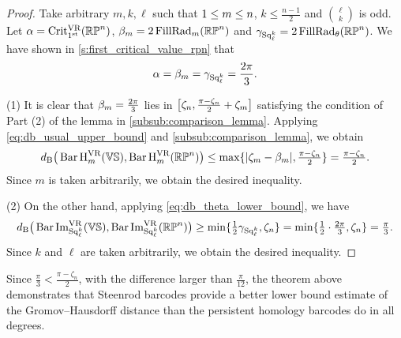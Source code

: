 \begin{proof}
	Take arbitrary $m, k, \ell$ such that $1 \leq m \leq n$, $k \leq \frac{n-1}{2}$ and $\binom{\ell}{k}$ is odd.
    Let $\alpha = \operatorname{Crit^{\mathrm{VR}}_{1^{\mathrm{st}}}}(\mathbb{RP}^n)$, $\beta_m = 2\operatorname{FillRad}_{m}(\mathbb{RP}^n)$ and $\gamma_{\operatorname{Sq}_\ell^k}= 2\operatorname{FillRad}_{\theta}(\mathbb{RP}^n)$.
    We have shown in \cref{s:first_critical_value_rpn} that
	$$
	\alpha = \beta_m = \gamma_{\operatorname{Sq}_\ell^k} = \frac{2\pi}{3}.
	$$

    (1) It is clear that %
    $\beta_m = \tfrac{2\pi}{3}$ lies in $\big[\zeta_n, \tfrac{\pi - \zeta_n}{2}+\zeta_m\big]$ satisfying the condition of Part (2) of the lemma in \cref{subsub:comparison_lemma}.
	Applying \cref{eq:db_usual_upper_bound} and \cref{subsub:comparison_lemma}, we obtain
	\[d_{\mathrm{B}}\big(\operatorname{Bar} \operatorname{H}_{m}^{\mathrm{VR}} (\mathbb{V}\mathbb{S}), \operatorname{Bar} \operatorname{H}_{m}^{\mathrm{VR}} (\mathbb{RP}^n)\big)
    \leq \max\{|\zeta_m  - \beta_m |, \tfrac{\pi - \zeta_n}{2}\}
    = \tfrac{\pi - \zeta_n}{2}.\]
    Since $m$ is taken arbitrarily, we obtain the desired inequality.

	(2) On the other hand, applying \cref{eq:db_theta_lower_bound}, we have
	\[\db\big(\sqbarcl{k}{\ell}{\VS}, \sqbarcl{k}{\ell}{\rp^n}\big)
	\geq \min\{\tfrac{1}{2}\gamma_{\Sq_\ell^k}, \zeta_n\}
	= \min\{\tfrac{1}{2}\cdot\tfrac{2\pi}{3}, \zeta_n\}
	= \tfrac{\pi}{3}.%
    \]
    Since $k$ and $\ell$ are taken arbitrarily, we obtain the desired inequality.
\end{proof}

Since \(\tfrac{\pi}{3} < \tfrac{\pi - \zeta_n}{2}\), with the difference larger than \(\tfrac{\pi}{12}\), the theorem above demonstrates that Steenrod barcodes provide a better lower bound estimate of the Gromov--Hausdorff distance than the persistent homology barcodes do in all degrees.